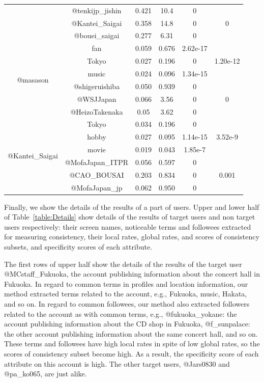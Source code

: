 \begin{table}[p]
\begin{center}
{\begin{tabular}{cccccc}
 & @tenkijp\_jishin & 0.421 & 10.4 & 0  & \\
 & @Kantei\_Saigai & 0.358 & 14.8 & 0 & 0 \\
 & @bouei\_saigai & 0.277 & 6.31 & 0 & \\ \midrule
 \multirow{6}{*}{@masason} & fan & 0.059 & 0.676 & 2.62e-17 \\
 & Tokyo & 0.027 & 0.196 & 0 & 1.20e-12 \\
 & music & 0.024 & 0.096 & 1.34e-15 & \\ \cmidrule(lr){2-6}
 & @shigeruishiba & 0.050 & 0.939 & 0 & \\
 & @WSJJapan & 0.066 & 3.56 & 0 & 0 \\
 & @HeizoTakenaka & 0.05 & 3.62 & 0 & \\ \midrule
 \multirow{6}{*}{@Kantei\_Saigai} & Tokyo & 0.034 & 0.196 & 0 & \\
 & hobby & 0.027 & 0.095 & 1.14e-15 & 3.52e-9 \\
 & movie & 0.019 & 0.043 & 1.85e-7 & \\ \cmidrule(lr){2-6}
 & @MofaJapan\_ITPR & 0.056 & 0.597 & 0 & \\
 & @CAO\_BOUSAI & 0.203 & 0.834 & 0 & 0.001 \\
 & @MofaJapan\_jp & 0.062 & 0.950 & 0 & \\ \bottomrule
\end{tabular}
}
\end{center}
\end{table}

Finally, we show the details of the results of a part of users.  Upper
and lower half of Table~\ref{table:Details} show details of the results
of target users and non target users respectively: their screen
names, noticeable terms and followees extracted for measuring
consistency, their local rates, global rates, and scores of consistency
subsets, and specificity scores of each attribute.

The first rows of upper half show the details of the results of the
target user @MCstaff\_Fukuoka, the account publishing information about
the concert hall in Fukuoka.  In regard to common terms in profiles and
location information, our method extracted terms related to the account,
e.g., Fukuoka, music, Hakata, and so on.  In regard to common followees,
our method also extracted followers related to the account as with
common terms, e.g., @fukuoka\_yokane: the account publishing information
about the CD shop in Fukuoka, @f\_sunpalace: the other account
publishing information about the same concert hall, and so on.  These
terms and followees have high local rates in spite of low global
rates, so the scores of consistency subset become high.  As a result, the
specificity score of each attribute on this account is high.  The other
target users, @Jars0830 and @pa\_ko065, are just alike.

